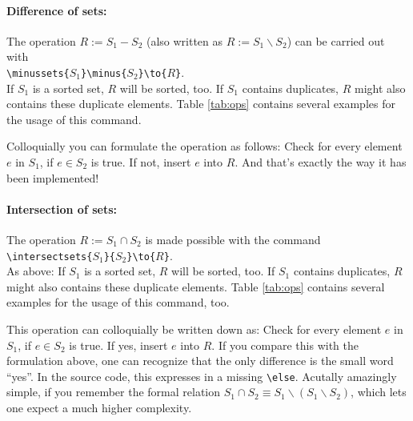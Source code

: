 \paragraph{Difference of sets:}The operation $R := S_1 - S_2$ (also written as $R := S_1 \backslash S_2$) can be carried out with\\
\mbox{}\hspace{2em}\verb|\minussets{|$S_1$\verb|}\minus{|$S_2$\verb|}\to{|$R$\verb|}|.\\
If $S_1$ is a sorted set, $R$ will be sorted, too. If $S_1$ contains duplicates, $R$ might also contains these duplicate elements. Table \ref{tab:ops} contains several examples for the usage of this command.

Colloquially you can formulate the operation as follows: Check for every element $e$ in $S_1$, if $e \in S_2$ is true. If not, insert $e$ into $R$. And that's exactly the way it has been implemented!

\paragraph{Intersection of sets:} The operation $R := S_1 \cap S_2$ is made possible with the command\\
\mbox{}\hspace{2em}\verb|\intersectsets{|$S_1$\verb|}{|$S_2$\verb|}\to{|$R$\verb|}|.\\
As above: If $S_1$ is a sorted set, $R$ will be sorted, too. If $S_1$ contains duplicates, $R$ might also contains these duplicate elements. Table \ref{tab:ops} contains several examples for the usage of this command, too.

This operation can colloquially be written down as: Check for every element $e$ in $S_1$, if $e \in S_2$ is true. If yes, insert $e$ into $R$. If you compare this with the formulation above, one can recognize that the only difference is the small word ``yes''. 
In the source code, this expresses in a missing \verb|\else|. Acutally amazingly simple, if you remember the formal relation $S_1 \cap S_2 \equiv S_1 \backslash (S_1\backslash S_2)$, which lets one expect a much higher complexity.


